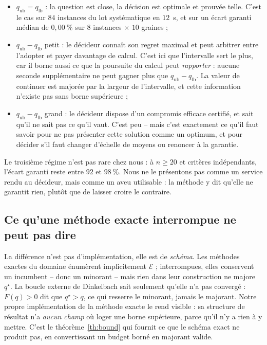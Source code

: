 \documentclass[11pt,a4paper]{article}
\theoremstyle{plain}
\theoremstyle{remark}
\newcommand{\Ecal}{\mathcal{E}}
\newcommand{\qs}{q^{\star}}
\begin{document}
\begin{itemize}[leftmargin=*,itemsep=3pt]
\item $q_{\text{ub}}=q_{\text{lb}}$ : la question est close, la décision est
      optimale et prouvée telle. C'est le cas sur $84$ instances du
      lot systématique en $12$~s, et sur un écart garanti médian de $0{,}00\ \%$ sur $8$ instances $\times$ $10$ graines ;
\item $q_{\text{ub}}-q_{\text{lb}}$ petit : le décideur connaît son regret
      maximal et peut arbitrer entre l'adopter et payer davantage de calcul.
      C'est ici que l'intervalle sert le plus, car il borne aussi ce que la
      poursuite du calcul peut \emph{rapporter} : aucune seconde
      supplémentaire ne peut gagner plus que $q_{\text{ub}}-q_{\text{lb}}$.
      La valeur de continuer est majorée par la largeur de l'intervalle,
      et cette information n'existe pas sans borne supérieure ;
\item $q_{\text{ub}}-q_{\text{lb}}$ grand : le décideur dispose d'un
      compromis efficace certifié, et sait qu'il ne sait pas ce qu'il vaut.
      C'est peu -- mais c'est exactement ce qu'il faut savoir pour ne pas
      présenter cette solution comme un optimum, et pour décider s'il faut
      changer d'échelle de moyens ou renoncer à la garantie.
\end{itemize}

\noindent
Le troisième régime n'est pas rare chez nous : à $n\ge 20$ et critères
indépendants, l'écart garanti reste entre $92$ et $98\ \%$. Nous ne le
présentons pas comme un service rendu au décideur, mais comme un aveu
utilisable : la méthode y dit qu'elle ne garantit rien, plutôt que de laisser
croire le contraire.

\subsection{Ce qu'une méthode exacte interrompue ne peut pas dire}

La différence n'est pas d'implémentation, elle est de \emph{schéma}. Les
méthodes exactes du domaine énumèrent implicitement $\Ecal$ ; interrompues,
elles conservent un incumbent -- donc un minorant -- mais rien dans leur
construction ne majore $\qs$. La boucle externe de Dinkelbach sait seulement
qu'elle n'a pas convergé : $F(q)>0$ dit que $\qs>q$, ce qui resserre le
minorant, jamais le majorant. Notre propre implémentation de la méthode
exacte le rend visible : sa structure de résultat n'a \emph{aucun champ} où
loger une borne supérieure, parce qu'il n'y a rien à y mettre. C'est le
théorème~\ref{th:bound} qui fournit ce que le schéma exact ne produit pas, en
convertissant un budget borné en majorant valide.
\end{document}
